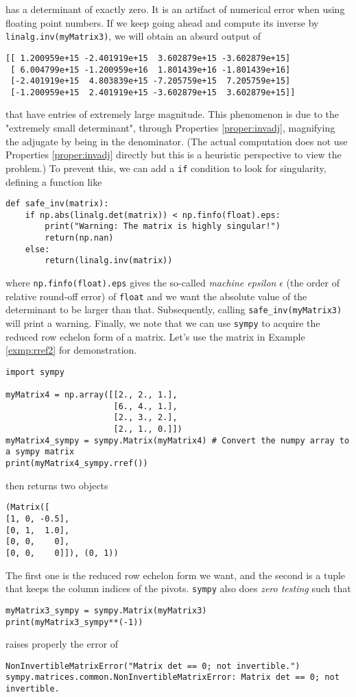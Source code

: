 has a determinant of exactly zero. It is an artifact of numerical error when using floating point numbers. If we keep going ahead and compute its inverse by \verb|linalg.inv(myMatrix3)|, we will obtain an absurd output of
\begin{lstlisting}
[[ 1.200959e+15 -2.401919e+15  3.602879e+15 -3.602879e+15]
 [ 6.004799e+15 -1.200959e+16  1.801439e+16 -1.801439e+16]
 [-2.401919e+15  4.803839e+15 -7.205759e+15  7.205759e+15]
 [-1.200959e+15  2.401919e+15 -3.602879e+15  3.602879e+15]]
\end{lstlisting}
that have entries of extremely large magnitude. This phenomenon is due to the "extremely small determinant", through Properties \ref{proper:invadj}, magnifying the adjugate by being in the denominator. (The actual computation does not use Properties \ref{proper:invadj} directly but this is a heuristic perspective to view the problem.) To prevent this, we can add a \verb|if| condition to look for singularity, defining a function like
\begin{lstlisting}
def safe_inv(matrix):
    if np.abs(linalg.det(matrix)) < np.finfo(float).eps:
        print("Warning: The matrix is highly singular!")
        return(np.nan)
    else:
        return(linalg.inv(matrix))
\end{lstlisting}
where \verb|np.finfo(float).eps| gives the so-called \textit{machine epsilon} $\epsilon$ (the order of relative round-off error) of \verb|float| and we want the absolute value of the determinant to be larger than that. Subsequently, calling \verb|safe_inv(myMatrix3)| will print a warning. Finally, we note that we can use \verb|sympy| to acquire the reduced row echelon form of a matrix. Let's use the matrix in Example \ref{exmp:rref2} for demonstration.
\begin{lstlisting}
import sympy

myMatrix4 = np.array([[2., 2., 1.],
                      [6., 4., 1.],
                      [2., 3., 2.],
                      [2., 1., 0.]])
myMatrix4_sympy = sympy.Matrix(myMatrix4) # Convert the numpy array to a sympy matrix
print(myMatrix4_sympy.rref())
\end{lstlisting}
then returns two objects
\begin{lstlisting}
(Matrix([
[1, 0, -0.5],
[0, 1,  1.0],
[0, 0,    0],
[0, 0,    0]]), (0, 1))    
\end{lstlisting}
The first one is the reduced row echelon form we want, and the second is a tuple that keeps the column indices of the pivots. \verb|sympy| also does \textit{zero testing} such that
\begin{lstlisting}
myMatrix3_sympy = sympy.Matrix(myMatrix3)
print(myMatrix3_sympy**(-1))    
\end{lstlisting}
raises properly the error of
\begin{lstlisting}
NonInvertibleMatrixError("Matrix det == 0; not invertible.") sympy.matrices.common.NonInvertibleMatrixError: Matrix det == 0; not invertible. 
\end{lstlisting}

